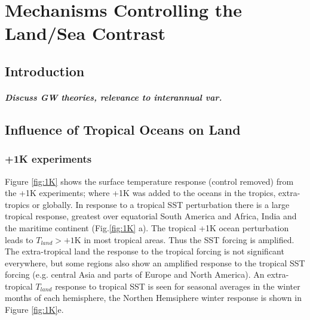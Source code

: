 \chapter{Mechanisms Controlling the Land/Sea Contrast} 

\label{mechanisms} 


\section{Introduction}
\paragraph{Discuss GW theories, relevance to interannual var.}


\section{Influence of Tropical Oceans on Land}

\subsection{+1K experiments}

Figure \ref{fig:1K} shows the surface temperature response (control removed) 
from the +1K experiments; where +1K was added to the oceans in the tropics, 
extra-tropics or globally. In response to a tropical SST perturbation there is a 
large tropical response, greatest over equatorial South America and Africa, 
India and the maritime continent (Fig.\ref{fig:1K} a). The tropical +1K ocean 
perturbation leads to $T_{land}>+1$K in most tropical areas. Thus the SST 
forcing is amplified. The extra-tropical land the response to the tropical 
forcing is not significant everywhere, but some regions also show an amplified 
response to the tropical SST forcing (e.g. central Asia and parts of Europe and 
North America).  An extra-tropical $T_{land}$ response to tropical SST is seen 
for seasonal averages in the winter months of each hemisphere, the Northen 
Hemsiphere winter response is shown in Figure \ref{fig:1K}e.

